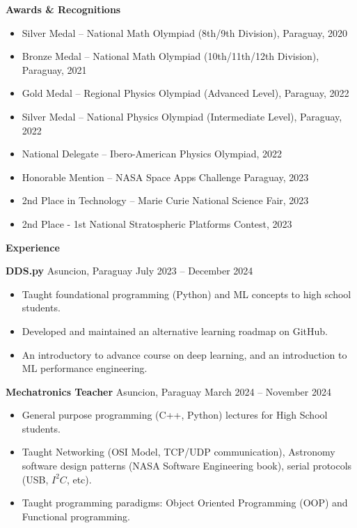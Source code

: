 \documentclass[11pt]{article}
\begin{document}
\begin{center}
    \textbf{Awards \& Recognitions}
\end{center}

\begin{itemize}[noitemsep]
    \item Silver Medal – National Math Olympiad (8th/9th Division), Paraguay, 2020
    \item Bronze Medal – National Math Olympiad (10th/11th/12th Division), Paraguay, 2021
    \item Gold Medal – Regional Physics Olympiad (Advanced Level), Paraguay, 2022
    \item Silver Medal – National Physics Olympiad (Intermediate Level), Paraguay, 2022
    \item National Delegate – Ibero-American Physics Olympiad, 2022
    \item Honorable Mention – NASA Space Apps Challenge Paraguay, 2023
    \item 2nd Place in Technology – Marie Curie National Science Fair, 2023
    \item 2nd Place - 1st National Stratospheric Platforms Contest, 2023
\end{itemize}


\begin{center}
    \textbf{Experience}
\end{center}

\textbf{DDS.py}	\hfill Asuncion, Paraguay
\hfill July 2023 – December 2024
\begin{itemize}[noitemsep]
  \item Taught foundational programming (Python) and ML concepts to high school students.
  \item Developed and maintained an alternative learning roadmap on GitHub.
  \item An introductory to advance course on deep learning, and an introduction to ML performance engineering.
\end{itemize}


\textbf{Mechatronics Teacher}	\hfill Asuncion, Paraguay
\hfill March 2024 – November 2024
\begin{itemize}[noitemsep]
  \item General purpose programming (C++, Python) lectures for High School students.
  \item Taught Networking (OSI Model, TCP/UDP communication), Astronomy software design patterns (NASA Software Engineering book), serial protocols (USB, $I^{2}C$, etc).
  \item Taught programming paradigms: Object Oriented Programming (OOP) and Functional programming.
\end{itemize}
\end{document}
